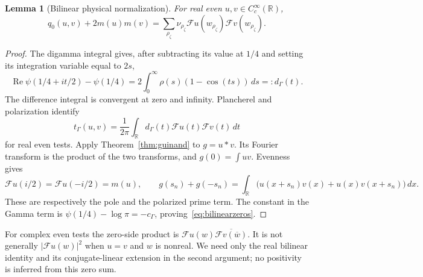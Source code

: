 \documentclass[11pt,a4paper]{article}
\numberwithin{equation}{section}
\newtheorem{lemma}[theorem]{Lemma}
\theoremstyle{definition}
\theoremstyle{remark}
\newcommand{\R}{\mathbb R}
\newcommand{\tg}{t_{\Gamma}}
\newcommand{\cg}{c_{\Gamma}}
\begin{document}
\begin{lemma}[Bilinear physical normalization]\label{lem:bilinear}
For real even $u,v\in C_c^\infty(\R)$,
\begin{equation}\label{eq:bilinearzeros}
 q_0(u,v)+2m(u)m(v)
   =\sum_{\rho_\zeta}\nu_{\rho_\zeta}
       \mathcal Fu(w_{\rho_\zeta})\mathcal Fv(w_{\rho_\zeta}).
\end{equation}
\end{lemma}
\begin{proof}
The digamma integral \cite[Eq.~5.9.16]{DLMF} gives, after subtracting its value at $1/4$ and setting its integration variable equal to $2s$,
\begin{equation}\label{eq:digammamultiplier}
 \operatorname{Re}\psi(1/4+it/2)-\psi(1/4)
    =2\int_0^\infty\rho(s)(1-\cos(ts))\,ds=:d_\Gamma(t).
\end{equation}
The difference integral is convergent at zero and infinity. Plancherel and polarization identify
\[
 \tg(u,v)=\frac1{2\pi}\int_\R
       d_\Gamma(t)\mathcal Fu(t)\mathcal Fv(t)\,dt
\]
for real even tests. Apply Theorem~\ref{thm:guinand} to $g=u*v$. Its Fourier transform is the product of the two transforms, and $g(0)=\int uv$. Evenness gives
\[
 \mathcal Fu(i/2)=\mathcal Fu(-i/2)=m(u),\qquad
 g(s_n)+g(-s_n)
  =\int_\R\bigl(u(x+s_n)v(x)+u(x)v(x+s_n)\bigr)\,dx.
\]
These are respectively the pole and the polarized prime term. The constant in the Gamma term is $\psi(1/4)-\log\pi=-\cg$, proving~\eqref{eq:bilinearzeros}.
\end{proof}

For complex even tests the zero-side product is
$\mathcal Fu(w)\overline{\mathcal Fv(\overline w)}$. It is not generally $|\mathcal Fu(w)|^2$ when $u=v$ and $w$ is nonreal. We need only the real bilinear identity and its conjugate-linear extension in the second argument; no positivity is inferred from this zero sum.
\end{document}
